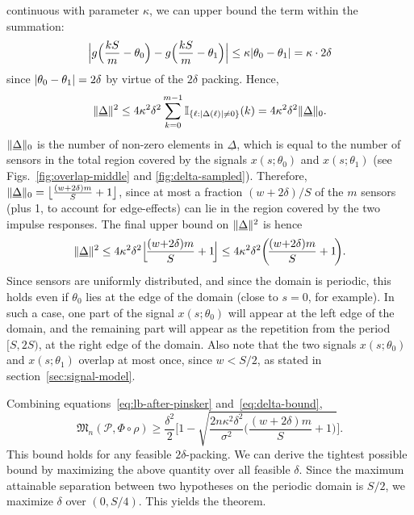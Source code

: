 \documentclass[conference]{IEEEtran}
\providecommand{\v}{}
\renewcommand{\v}[1]{\underline{#1}}
\DeclarePairedDelimiter\abs{\lvert}{\rvert}
\DeclarePairedDelimiter\norm{\lVert}{\rVert}
\DeclarePairedDelimiter\floor{\lfloor}{\rfloor}
\newcommand{\Phiorho}{\Phi\!\circ\!\rho}
\begin{document}
\begin{IEEEproof}
continuous with parameter $\kappa$, we can upper bound the term within the
summation:
\begin{equation}
	\abs[\Big]{g\Big(\frac{kS}{m} - \theta_0\Big) - g\Big(\frac{kS}{m} - \theta_1\Big)} \leq \kappa \abs{\theta_0 - \theta_1} = \kappa \cdot 2\delta
\end{equation}
since $\abs{\theta_0 - \theta_1} = 2\delta$ by virtue of the $2\delta$ packing.
Hence,
\begin{equation}
	\norm{\v\Delta}^2 \leq 4 \kappa^2 \delta^2 \sum_{k=0}^{m-1} \mathbb I_{\{\ell: \abs{\Delta(\ell)} \neq 0\}}(k) = 4 \kappa^2 \delta^2 \norm{\v\Delta}_0.
\end{equation}
$\norm{\v\Delta}_0$ is the number of non-zero elements in $\v\Delta$, which is
equal to the number of sensors in the total region covered by the signals
$x(s;\theta_0)$ and $x(s;\theta_1)$ (see Figs.~\ref{fig:overlap-middle} and
\ref{fig:delta-sampled}). Therefore, $\norm{\v\Delta}_0 = \floor[\big]{\frac{(w
+ 2\delta)m}{S} + 1}$, since at most a fraction $(w + 2\delta) / S$ of the $m$
sensors (plus 1, to account for edge-effects) can lie in the region covered by
the two impulse responses. The final upper bound on $\norm{\v\Delta}^2$ is
hence
\begin{equation} \label{eq:delta-bound}
	\norm{\v\Delta}^2 \leq 4 \kappa^2 \delta^2 \floor[\Big]{\!\frac{(w{+}2\delta)m}{S} + 1\!} \leq 4 \kappa^2 \delta^2 \bigg(\!\frac{(w{+}2\delta) m}{S} + 1\!\bigg).
\end{equation}
Since sensors are uniformly distributed, and since the domain is periodic, this
holds even if $\theta_0$ lies at the edge of the domain (close to $s=0$, for
example). In such a case, one part of the signal $x(s;\theta_0)$ will appear at
the left edge of the domain, and the remaining part will appear as the
repetition from the period $[S, 2S)$, at the right edge of the domain. Also
note that the two signals $x(s;\theta_0)$ and $x(s;\theta_1)$ overlap at most
once, since $w < S/2$, as stated in section~\ref{sec:signal-model}.

Combining equations~\eqref{eq:lb-after-pinsker} and~\eqref{eq:delta-bound},
\begin{equation} \label{eq:lb-after-delta-bound}
	\mathfrak{M}_n(\mathcal{P}, \Phiorho) \geq \frac{\delta^2}{2} \Bigg[1 - \sqrt{\frac{2n \kappa^2 \delta^2}{\sigma^2}\bigg(\!\frac{(w{+}2\delta) m}{S} + 1\!\bigg)} \Bigg].
\end{equation}
This bound holds for any feasible $2\delta$-packing. We can derive the tightest
possible bound by maximizing the above quantity over all feasible $\delta$.
Since the maximum attainable separation between two hypotheses on the periodic
domain is $S/2$, we maximize $\delta$ over $(0, S/4)$. This yields the theorem.


\end{IEEEproof}
\end{document}
